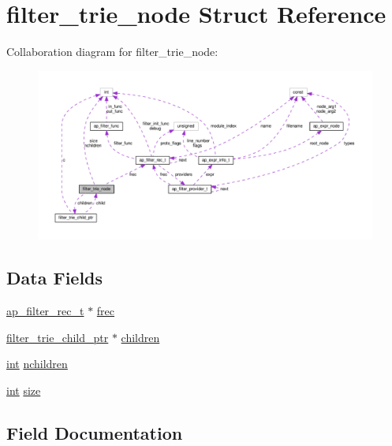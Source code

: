 \hypertarget{structfilter__trie__node}{}\section{filter\+\_\+trie\+\_\+node Struct Reference}
\label{structfilter__trie__node}


Collaboration diagram for filter\+\_\+trie\+\_\+node\+:
\nopagebreak
\begin{figure}[H]
\begin{center}
\leavevmode
\includegraphics[width=350pt]{structfilter__trie__node__coll__graph}
\end{center}
\end{figure}
\subsection*{Data Fields}
\begin{DoxyCompactItemize}
\item 
\hyperlink{structap__filter__rec__t}{ap\+\_\+filter\+\_\+rec\+\_\+t} $\ast$ \hyperlink{structfilter__trie__node_aec5a75fedd62b0bf4535853674a5b644}{frec}
\item 
\hyperlink{structfilter__trie__child__ptr}{filter\+\_\+trie\+\_\+child\+\_\+ptr} $\ast$ \hyperlink{structfilter__trie__node_a5dba3275ecd0e702026b73a931824339}{children}
\item 
\hyperlink{pcre_8txt_a42dfa4ff673c82d8efe7144098fbc198}{int} \hyperlink{structfilter__trie__node_a2c2c69ffe59b1e2b373d35aa9927e21d}{nchildren}
\item 
\hyperlink{pcre_8txt_a42dfa4ff673c82d8efe7144098fbc198}{int} \hyperlink{structfilter__trie__node_a017d42caf30b40603b142ccf92b9a898}{size}
\end{DoxyCompactItemize}


\subsection{Field Documentation}
